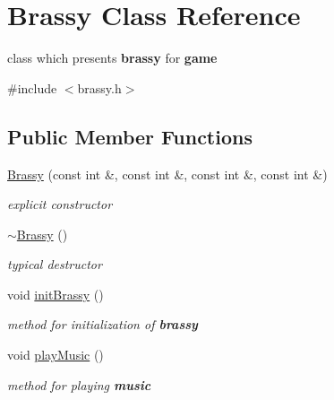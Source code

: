 \hypertarget{class_brassy}{}\section{Brassy Class Reference}
\label{class_brassy}


class which presents {\bfseries{brassy}} for {\bfseries{game}}  




{\ttfamily \#include $<$brassy.\+h$>$}

\subsection*{Public Member Functions}
\begin{DoxyCompactItemize}
\item 
\mbox{\label{class_brassy_ac4f6ddddc52fb6644ed65d7519f5bf36}} 
\mbox{\hyperlink{class_brassy_ac4f6ddddc52fb6644ed65d7519f5bf36}{Brassy}} (const int \&, const int \&, const int \&, const int \&)
\begin{DoxyCompactList}\small\item\em explicit {\itshape constructor} \end{DoxyCompactList}\item 
\mbox{\label{class_brassy_a26336b309e73dfb01e52e70ddc292b4b}} 
\mbox{\hyperlink{class_brassy_a26336b309e73dfb01e52e70ddc292b4b}{$\sim$\+Brassy}} ()
\begin{DoxyCompactList}\small\item\em typical {\itshape destructor} \end{DoxyCompactList}\item 
\mbox{\label{class_brassy_a46329d4d7cd838f6c54178aeac1ad987}} 
void \mbox{\hyperlink{class_brassy_a46329d4d7cd838f6c54178aeac1ad987}{init\+Brassy}} ()
\begin{DoxyCompactList}\small\item\em {\itshape method} for initialization of {\bfseries{brassy}} \end{DoxyCompactList}\item 
\mbox{\label{class_brassy_acb61581e70c68a756000cc83ab557237}} 
void \mbox{\hyperlink{class_brassy_acb61581e70c68a756000cc83ab557237}{play\+Music}} ()
\begin{DoxyCompactList}\small\item\em {\itshape method} for playing {\bfseries{music}} \end{DoxyCompactList}\item 

\end{DoxyCompactItemize}
